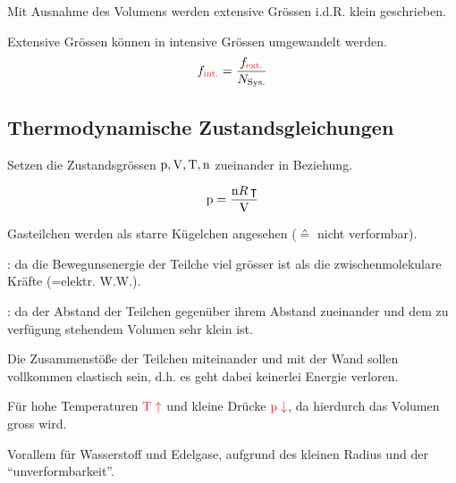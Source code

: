 \begin{notebox}[Bemerkung]\nospacing
\begin{numberlist}
    \item Mit Ausnahme des Volumens werden extensive Grössen i.d.R. klein geschrieben.
    \item Extensive Grössen können in intensive Grössen umgewandelt werden.
  \begin{align}
    f_{\text{\rd{int.}}}=\frac{f_{\text{\rd{ext.}}}}{N_{\text{Sys.}}}\label{eq:extensiveTointensive}
  \end{align}
\end{numberlist}
\end{notebox}
\subsection{Thermodynamische Zustandsgleichungen}
  \label{subsec:Thermodynamische_Zustandsgleichungen}
\begin{sectionbox}\nospacing
  Setzen die Zustandsgrössen $\mathrm{p},\mathrm{V},\mathrm{T},\mathrm{n}$ zueinander in Beziehung.
\end{sectionbox}
\begin{lawbox}\nospacing
  \begin{law}
    \begin{align}
      \mathrm{p}=\frac{\mathrm{n}R\operatorname{\intercal}}{\mathrm{V}}
    \end{align}
  \end{law}
\end{lawbox}
\begin{notebox}[Annahmen]
  \begin{numberlist}
      \item Gasteilchen werden als starre Kügelchen angesehen ($\corresponds$ nicht verformbar).
      \item {}: da die Bewegunsenergie der Teilche viel grösser ist als die
    zwischenmolekulare Kräfte (=elektr. W.W.).
      \item {}: da der Abstand der Teilchen gegenüber ihrem Abstand
    zueinander und dem zu verfügung stehendem Volumen sehr klein ist.
      \item Die Zusammenstöße der Teilchen miteinander und mit der Wand sollen vollkommen elastisch sein, d.h. es geht dabei keinerlei Energie verloren. 
  \end{numberlist}
\end{notebox}
\begin{notebox}[Gültigkeitsbereich]
  \begin{numberlist}
      \item Für hohe Temperaturen $\rd{\Tz\uparrow}$ und kleine Drücke $\rd{\pz\downarrow}$, da hierdurch das Volumen
    gross wird.
      \item Vorallem für Wasserstoff und Edelgase, aufgrund des kleinen Radius und der ``unverformbarkeit''.
  \end{numberlist}
\end{notebox}
